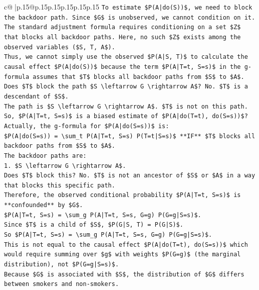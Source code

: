 \documentclass{article}
\begin{document}
{\begin{supertabular}{c@{$\;$}|p{.15\linewidth}@{}p{.15\linewidth}p{.15\linewidth}p{.15\linewidth}p{.15\linewidth}p{.15\linewidth}}
{{{\texttt{To estimate \$P(A|do(S))\$, we need to block the backdoor path. Since \$G\$ is unobserved, we cannot condition on it.} \\
\texttt{The standard adjustment formula requires conditioning on a set \$Z\$ that blocks all backdoor paths. Here, no such \$Z\$ exists among the observed variables (\$S, T, A\$).} \\
\texttt{Thus, we cannot simply use the observed \$P(A|S, T)\$ to calculate the causal effect \$P(A|do(S))\$ because the term \$P(A|T=t, S=s)\$ in the g{-}formula assumes that \$T\$ blocks all backdoor paths from \$S\$ to \$A\$.} \\
\texttt{Does \$T\$ block the path \$S \textbackslash{}leftarrow G \textbackslash{}rightarrow A\$? No. \$T\$ is a descendant of \$S\$.} \\
\texttt{The path is \$S \textbackslash{}leftarrow G \textbackslash{}rightarrow A\$. \$T\$ is not on this path.} \\
\texttt{So, \$P(A|T=t, S=s)\$ is a biased estimate of \$P(A|do(T=t), do(S=s))\$?} \\
\texttt{Actually, the g{-}formula for \$P(A|do(S=s))\$ is:} \\
\texttt{\$P(A|do(S=s)) = \textbackslash{}sum\_t P(A|T=t, S=s) P(T=t|S=s)\$ **IF** \$T\$ blocks all backdoor paths from \$S\$ to \$A\$.} \\
\texttt{The backdoor paths are:} \\
\texttt{1. \$S \textbackslash{}leftarrow G \textbackslash{}rightarrow A\$.} \\
\texttt{Does \$T\$ block this? No. \$T\$ is not an ancestor of \$S\$ or \$A\$ in a way that blocks this specific path.} \\
\texttt{Therefore, the observed conditional probability \$P(A|T=t, S=s)\$ is **confounded** by \$G\$.} \\
\texttt{\$P(A|T=t, S=s) = \textbackslash{}sum\_g P(A|T=t, S=s, G=g) P(G=g|S=s)\$.} \\
\texttt{Since \$T\$ is a child of \$S\$, \$P(G|S, T) = P(G|S)\$.} \\
\texttt{So \$P(A|T=t, S=s) = \textbackslash{}sum\_g P(A|T=t, S=s, G=g) P(G=g|S=s)\$.} \\
\texttt{This is not equal to the causal effect \$P(A|do(T=t), do(S=s))\$ which would require summing over \$g\$ with weights \$P(G=g)\$ (the marginal distribution), not \$P(G=g|S=s)\$.} \\
\texttt{Because \$G\$ is associated with \$S\$, the distribution of \$G\$ differs between smokers and non{-}smokers.} \\
}}}
\end{supertabular}}
\end{document}

